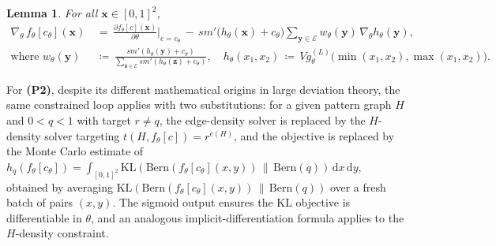 \documentclass[11pt]{article}
\theoremstyle{plain}
\newtheorem{lemma}{Lemma}[section]
\theoremstyle{definition}
\theoremstyle{remark}
\begin{document}
\begin{lemma}\label{lem:implicitdifferentiation}
For all $\mathbf{x} \in [0,1]^2$,
\begin{align*}
\nabla_\theta\, f_\theta[c_\theta](\mathbf{x})
\,&=\, \frac{\partial f_\theta[c](\mathbf{x})}{\partial \theta}\bigg|_{c = c_\theta}
\,-\, \mathit{sm}'\bigl(h_\theta(\mathbf{x}) + c_\theta\bigr)
\sum_{\mathbf{y} \in \mathcal{E}} w_\theta(\mathbf{y})\, \nabla_\theta h_\theta(\mathbf{y}),
\\
\text{where }
w_\theta(\mathbf{y}) \,&\coloneqq\, \frac{\mathit{sm}'(h_\theta(\mathbf{y}) + c_\theta)}{\sum_{\mathbf{z} \in \mathcal{E}} \mathit{sm}'(h_\theta(\mathbf{z}) + c_\theta)},
\quad
h_\theta(x_1, x_2) \,\coloneqq\, V g_\theta^{(L)}\!\bigl(\min(x_1, x_2), \max(x_1, x_2)\bigr).
\end{align*}
\end{lemma}

For \textbf{(P2)}, despite its different mathematical origins in large deviation theory, the same constrained loop applies with two substitutions: for a given pattern graph $H$ and $0<q<1$ with target $r \neq q$, the edge-density solver is replaced by the $H$-density solver targeting $t(H, f_\theta[c]) = r^{e(H)}$, and the objective is replaced by the Monte Carlo estimate of $h_q(f_\theta[c_\theta])=\int_{[0,1]^2} \mathrm{KL}(\mathrm{Bern}(f_\theta[c_\theta](x,y))\,\|\,\mathrm{Bern}(q))\,\mathrm{d}x\,\mathrm{d}y$, obtained by averaging $\mathrm{KL}(\mathrm{Bern}(f_\theta[c_\theta](x,y))\,\|\,\mathrm{Bern}(q))$ over a fresh batch of pairs $(x,y)$. The sigmoid output ensures the KL objective is differentiable in $\theta$, and an analogous implicit-differentiation formula applies to the $H$-density constraint.
\end{document}
